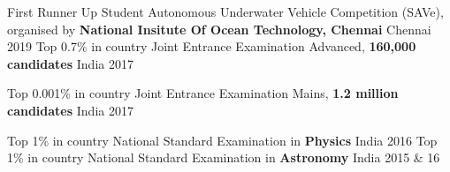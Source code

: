 
\begin{cvhonors}
  \cvhonor
    {First Runner Up}
    {Student Autonomous Underwater Vehicle Competition (SAVe), \break organised by\textbf{ National Insitute Of Ocean Technology, Chennai}} 
    {Chennai} 
    {2019}
  \cvhonor
    {Top 0.7\% in country}
    {Joint Entrance Examination Advanced, \textbf{160,000 candidates}} 
    {India} 
    {2017}

  \cvhonor
    {Top 0.001\% in country} 
    {Joint Entrance Examination Mains, \textbf{1.2 million candidates}} 
    {India}
    {2017}

 \cvhonor
    {Top 1\% in country} 
    {National Standard Examination in \textbf{Physics}}
    {India}
    {2016}
 \cvhonor
    {Top 1\% in country} 
    {National Standard Examination in \textbf{Astronomy}}
    {India}
    {2015 \& 16}

\end{cvhonors}
